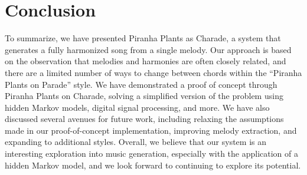 \section{Conclusion}

To summarize, we have presented Piranha Plants as Charade, a system that generates a fully harmonized song from a single melody. Our approach is based on the observation that melodies and harmonies are often closely related, and there are a limited number of ways to change between chords within the ``Piranha Plants on Parade'' style. We have demonstrated a proof of concept through Piranha Plants on Charade, solving a simplified version of the problem using hidden Markov models, digital signal processing, and more. We have also discussed several avenues for future work, including relaxing the assumptions made in our proof-of-concept implementation, improving melody extraction, and expanding to additional styles. Overall, we believe that our system is an interesting exploration into music generation, especially with the application of a hidden Markov model, and we look forward to continuing to explore its potential.
